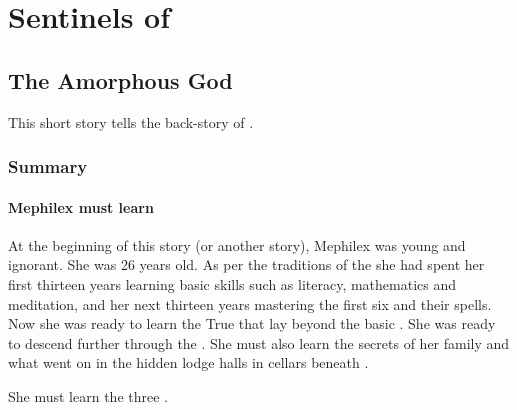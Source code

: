 
\part{Sentinels of \Miith}























\chapter{The Amorphous God}
This short story tells the back-story of . 















\section{Summary}









\subsection{Mephilex must learn \arcana}
At the beginning of this story (or another story), Mephilex was young and ignorant.
She was 26 years old. 
As per the traditions of the \Yormissian \rethyaxes she had spent her first thirteen years learning basic skills such as literacy, mathematics and meditation, and her next thirteen years mastering the first six  and their spells. 
Now she was ready to learn the True \Arcana that lay beyond the basic \arcana. 
She was ready to descend further through the . 
She must also learn the secrets of her family and what went on in the hidden lodge halls in cellars beneath \Yormis. 

She must learn the three .

